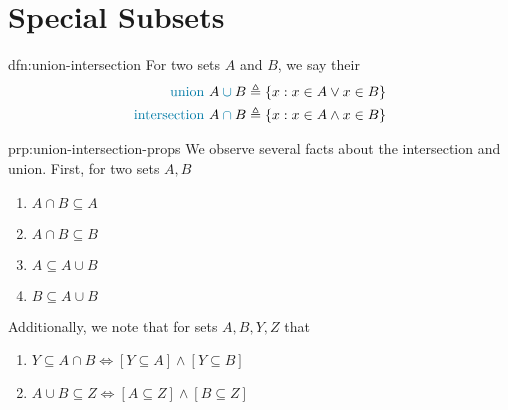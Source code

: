 \section{Special Subsets}\label{sec:subsets}

\begin{dfn}{dfn:union-intersection}
    For two sets \( A \) and \( B \), we say their
    \begin{align*}
        \text{\textcolor{dfn-color}{union} } & A \mathbin{\textcolor{dfn-color}{\cup}} B \triangleq \{ x : x \in A \lor x \in B \} \\
        \text{\textcolor{dfn-color}{intersection} } & A \mathbin{\textcolor{dfn-color}{\cap}} B \triangleq \{ x : x \in A \land x \in B \}
    \end{align*}
\end{dfn}

\begin{prp}{prp:union-intersection-props}
    We observe several facts about the intersection and union.
    First, for two sets \( A, B \)
    \begin{enumerate}
        \item \( A \hyperref[dfn:union-intersection]{\cap} B \subseteq A \)
        \item \( A \hyperref[dfn:union-intersection]{\cap} B \subseteq B \)
        \item \( A \subseteq A \hyperref[dfn:union-intersection]{\cup} B \)
        \item \( B \subseteq A \hyperref[dfn:union-intersection]{\cup} B \)
    \end{enumerate}
    Additionally, we note that for sets \( A, B, Y, Z \) that
    \begin{enumerate}
        \item \( Y \subseteq A \hyperref[dfn:union-intersection]{\cap} B \iff [Y \subseteq A] \land [Y \subseteq B] \)
        \item \( A \hyperref[dfn:union-intersection]{\cup} B \subseteq Z \iff [A \subseteq Z] \land [B \subseteq Z] \)
    \end{enumerate}
\end{prp}

